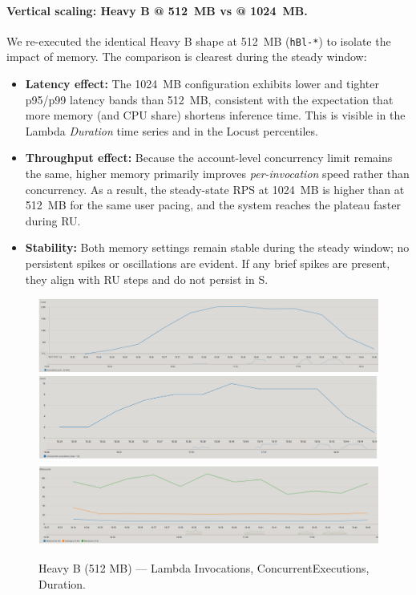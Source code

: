 \documentclass[11pt,a4paper]{article}
\begin{document}
\paragraph{Vertical scaling: Heavy B @ \SI{512}{MB} vs @ \SI{1024}{MB}.}
We re-executed the identical Heavy B shape at \SI{512}{MB} (\texttt{hBl-*}) to isolate the impact of memory. The comparison is clearest during the steady window:
\begin{itemize}
  \item \textbf{Latency effect:} The \SI{1024}{MB} configuration exhibits lower and tighter p95/p99 latency bands than \SI{512}{MB}, consistent with the expectation that more memory (and CPU share) shortens inference time. This is visible in the Lambda \emph{Duration} time series and in the Locust percentiles.
  \item \textbf{Throughput effect:} Because the account-level concurrency limit remains the same, higher memory primarily improves \emph{per-invocation} speed rather than concurrency. As a result, the steady-state RPS at \SI{1024}{MB} is higher than at \SI{512}{MB} for the same user pacing, and the system reaches the plateau faster during RU.
  \item \textbf{Stability:} Both memory settings remain stable during the steady window; no persistent spikes or oscillations are evident. If any brief spikes are present, they align with RU steps and do not persist in S.
\end{itemize}

\begin{figure}[h!] \centering
  \includegraphics[width=.32\linewidth]{"figures/hBl - Invocations.png"}\hfill
  \includegraphics[width=.32\linewidth]{"figures/hBl - ConcEx.png"}\hfill
  \includegraphics[width=.32\linewidth]{"figures/hBl - Duration.png"}
  \caption{Heavy B (512 MB) --- Lambda Invocations, ConcurrentExecutions, Duration.}
\end{figure}
\end{document}
